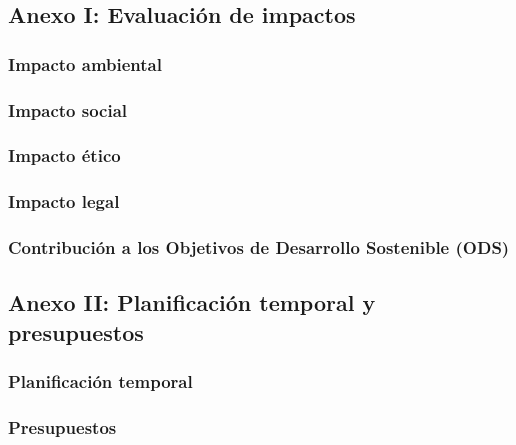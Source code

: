 \documentclass[a4paper, 12pt, spanish, twoside]{article}
\begin{document}

\subsection{Anexo I: Evaluación de impactos} \label{sec:anexo1}
\subsubsection{Impacto ambiental} \label{sec:anexo1:ambiental}
\subsubsection{Impacto social} \label{sec:anexo1:social}
\subsubsection{Impacto ético} \label{sec:anexo1:etico}
\subsubsection{Impacto legal} \label{sec:anexo1:legal}
\subsubsection{Contribución a los Objetivos de Desarrollo Sostenible (ODS)} \label{sec:ods}

\clearpage




\newpage
\subsection{Anexo II: Planificación temporal y presupuestos} \label{sec:anexo2}
\subsubsection{Planificación temporal} \label{sec:anexo2:temporal}
\subsubsection{Presupuestos} \label{sec:anexo2:presupuestos}
\end{document}
